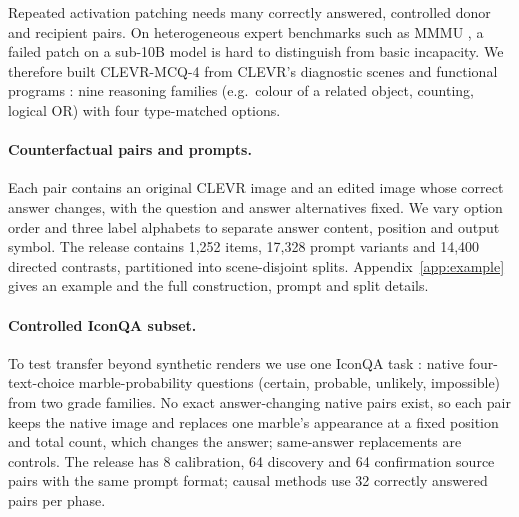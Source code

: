\documentclass[11pt]{article}
\begin{document}
Repeated activation patching needs many correctly answered, controlled donor and recipient pairs. On heterogeneous expert benchmarks such as MMMU \citep{yue2024mmmu}, a failed patch on a sub-10B model is hard to distinguish from basic incapacity. We therefore built CLEVR-MCQ-4 from CLEVR's diagnostic scenes and functional programs \citep{Johnson_2017_CVPR}: nine reasoning families (e.g.\ colour of a related object, counting, logical OR) with four type-matched options.

\paragraph{Counterfactual pairs and prompts.} Each pair contains an original CLEVR image and an edited image whose correct answer changes, with the question and answer alternatives fixed. We vary option order and three label alphabets to separate answer content, position and output symbol. The release contains 1,252 items, 17,328 prompt variants and 14,400 directed contrasts, partitioned into scene-disjoint splits. Appendix~\ref{app:example} gives an example and the full construction, prompt and split details.

\paragraph{Controlled IconQA subset.} To test transfer beyond synthetic renders we use one IconQA task \citep{lu2021iconqa}: native four-text-choice marble-probability questions (certain, probable, unlikely, impossible) from two grade families. No exact answer-changing native pairs exist, so each pair keeps the native image and replaces one marble's appearance at a fixed position and total count, which changes the answer; same-answer replacements are controls. The release has 8 calibration, 64 discovery and 64 confirmation source pairs with the same prompt format; causal methods use 32 correctly answered pairs per phase.
\end{document}
